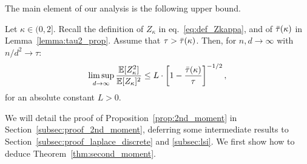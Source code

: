 The main element of our analysis is the following upper bound.
\begin{proposition}\label{prop:2nd_moment}
    Let $\kappa \in (0, 2]$. Recall the definition of $Z_\kappa$ in eq.~\eqref{eq:def_Zkappa}, and of ${\bar{\tau}}(\kappa)$ in Lemma~\ref{lemma:tau2_prop}.
    Assume that $\tau > {\bar{\tau}}(\kappa)$.
    Then, for $n, d \to \infty$ with $n/d^2 \to \tau$:
    \begin{equation*} 
        \limsup_{d \to \infty} \frac{\mathbb{E}[Z_\kappa^2]}{\mathbb{E}[Z_\kappa]^2} \leq L \cdot \left[1 - \frac{{\bar{\tau}}(\kappa)}{\tau}\right]^{-1/2},
    \end{equation*}
    for an absolute constant $L > 0$.
\end{proposition}
\noindent
We will detail the proof of Proposition~\ref{prop:2nd_moment} in Section~\ref{subsec:proof_2nd_moment}, deferring some intermediate results to Section~\ref{subsec:proof_laplace_discrete} and \ref{subsec:lsi}. 
We first show how to deduce Theorem~\ref{thm:second_moment}.

